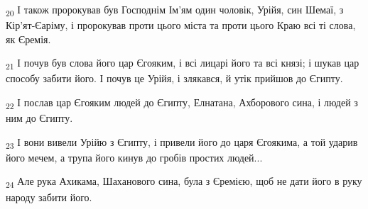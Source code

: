 \begin{tcolorbox}
\textsubscript{20} І також пророкував був Господнім Ім'ям один чоловік, Урійя, син Шемаї, з Кір'ят-Єаріму, і пророкував проти цього міста та проти цього Краю всі ті слова, як Єремія.
\end{tcolorbox}
\begin{tcolorbox}
\textsubscript{21} І почув був слова його цар Єгояким, і всі лицарі його та всі князі; і шукав цар способу забити його. І почув це Урійя, і злякався, й утік прийшов до Єгипту.
\end{tcolorbox}
\begin{tcolorbox}
\textsubscript{22} І послав цар Єгояким людей до Єгипту, Елнатана, Ахборового сина, і людей з ним до Єгипту.
\end{tcolorbox}
\begin{tcolorbox}
\textsubscript{23} І вони вивели Урійю з Єгипту, і привели його до царя Єгоякима, а той ударив його мечем, а трупа його кинув до гробів простих людей...
\end{tcolorbox}
\begin{tcolorbox}
\textsubscript{24} Але рука Ахикама, Шаханового сина, була з Єремією, щоб не дати його в руку народу забити його.
\end{tcolorbox}

